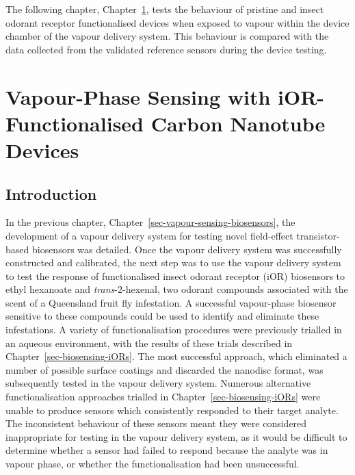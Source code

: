 \documentclass[
  a4paper,
]{scrbook}
\begin{document}
The following chapter, Chapter~\ref{sec-vapour-biosensing-iORs}, tests
the behaviour of pristine and insect odorant receptor functionalised
devices when exposed to vapour within the device chamber of the vapour
delivery system. This behaviour is compared with the data collected from
the validated reference sensors during the device testing.


\hypertarget{sec-vapour-biosensing-iORs}{%
\chapter{Vapour-Phase Sensing with iOR-Functionalised Carbon Nanotube
Devices}\label{sec-vapour-biosensing-iORs}}

\hypertarget{introduction-6}{%
\section{Introduction}\label{introduction-6}}

In the previous chapter, Chapter~\ref{sec-vapour-sensing-biosensors},
the development of a vapour delivery system for testing novel
field-effect transistor-based biosensors was detailed. Once the vapour
delivery system was successfully constructed and calibrated, the next
step was to use the vapour delivery system to test the response of
functionalised insect odorant receptor (iOR) biosensors to ethyl
hexanoate and \emph{trans}-2-hexenal, two odorant compounds associated
with the scent of a Queensland fruit fly infestation. A successful
vapour-phase biosensor sensitive to these compounds could be used to
identify and eliminate these infestations. A variety of
functionalisation procedures were previously trialled in an aqueous
environment, with the results of these trials described in
Chapter~\ref{sec-biosensing-iORs}. The most successful approach, which
eliminated a number of possible surface coatings and discarded the
nanodisc format, was subsequently tested in the vapour delivery system.
Numerous alternative functionalisation approaches trialled in
Chapter~\ref{sec-biosensing-iORs} were unable to produce sensors which
consistently responded to their target analyte. The inconsistent
behaviour of these sensors meant they were considered inappropriate for
testing in the vapour delivery system, as it would be difficult to
determine whether a sensor had failed to respond because the analyte was
in vapour phase, or whether the functionalisation had been unsuccessful.
\end{document}

